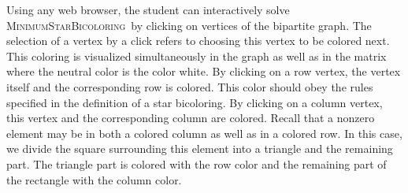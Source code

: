 \documentclass[12pt, oneside]{book}
\newcommand{\MinStaBic}{\textsc{MinimumStarBicoloring}}
\begin{document}
Using any web browser, the student can interactively solve \MinStaBic\ by clicking on
vertices of the bipartite graph. The selection of a vertex by a click refers to choosing
this vertex to be colored next. This coloring is visualized simultaneously in the graph
as well as in the matrix where the neutral color is the color white. By clicking on a row
vertex, the vertex itself and the corresponding row is colored. This color should obey
the rules specified in the definition of a star bicoloring. By clicking on a column
vertex, this vertex and the corresponding column are colored. Recall that a nonzero
element may be in both a colored column as well as in a colored row. In this case, we
divide the square surrounding this element into a triangle and the remaining part. The
triangle part is colored with the row color and the remaining part of the rectangle with
the column color.
\end{document}
